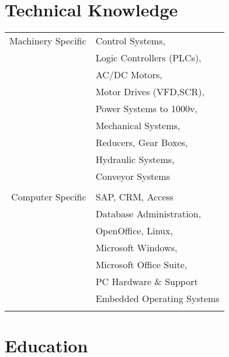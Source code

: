 \documentclass[10pt]{article} %
\begin{document}
\begin{minipage}[t]{0.44\textwidth}
\begin{tabular}{rl}
\end{tabular}\\[10pt]


\section{Technical Knowledge} 

\begin{tabular}{rl}
Machinery Specific
& Control Systems, \\ 
& Logic Controllers (PLCs), \\
& AC/DC Motors, \\
& Motor Drives (VFD,SCR), \\
& Power Systems to 1000v, \\
& Mechanical Systems, \\
& Reducers, Gear Boxes, \\
& Hydraulic Systems, \\
& Conveyor Systems \\ \\
Computer Specific
& SAP, CRM, Access \\
& Database Administration, \\
& OpenOffice, Linux,\\
& Microsoft Windows, \\
& Microsoft Office Suite, \\
& PC Hardware \& Support\\
& Embedded Operating Systems \\ 
\\
\end{tabular}


\section{Education} 

\begin{tabular}{rl} %



\end{tabular}
\end{minipage}
\end{document}

